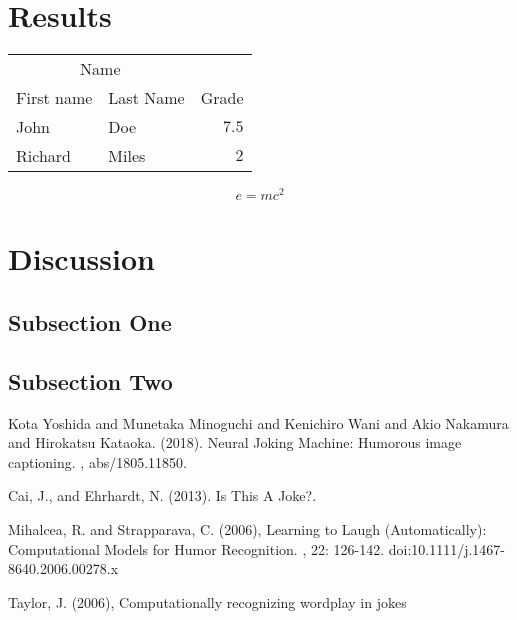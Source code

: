 \documentclass[twoside,twocolumn]{article}
\begin{document}
\section{Results}


\begin{center}
\begin{tabular}{llr}
\toprule
\multicolumn{2}{c}{Name} \\
\cmidrule(r){1-2}
First name & Last Name & Grade \\
\midrule
John & Doe & $7.5$ \\
Richard & Miles & $2$ \\
\bottomrule
\end{tabular}
\end{center}



\begin{equation}
\label{eq:emc}
e = mc^2
\end{equation}




\section{Discussion}

\subsection{Subsection One}


\subsection{Subsection Two}




\begin{thebibliography}{99} %


Kota Yoshida and Munetaka Minoguchi and Kenichiro Wani and Akio Nakamura and Hirokatsu Kataoka. (2018).
\newblock Neural Joking Machine: Humorous image captioning.
, abs/1805.11850.

Cai, J., and Ehrhardt, N. (2013). 
\newblock Is This A Joke?.

Mihalcea, R. and Strapparava, C. (2006), 
\newblock Learning to Laugh (Automatically): Computational Models for Humor Recognition.
, 22: 126-142. doi:10.1111/j.1467-8640.2006.00278.x

Taylor, J. (2006), 
\newblock Computationally recognizing wordplay in jokes

\end{thebibliography}

\end{document}
